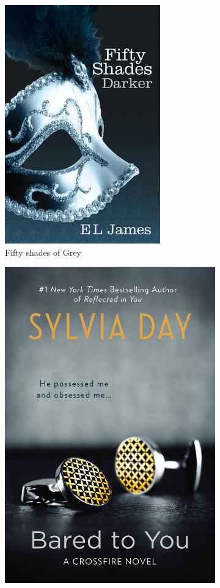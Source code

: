 \documentclass[11pt,a4paper]{article}
\begin{document}
\begin{figure}[H]
\begin{subfigure}{0.33\textwidth}
\includegraphics[width=.8\linewidth]{fifty}
\caption{Fifty shades of Grey}
\end{subfigure}
\begin{subfigure}{0.33\textwidth}
\centering
\includegraphics[width=.8\linewidth]{baredtoyou}

\end{subfigure}
\end{figure}
\end{document}
